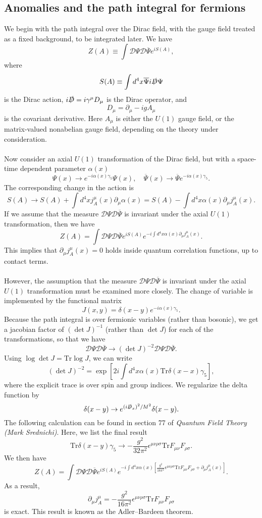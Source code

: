 \subsection{Anomalies and the path integral for fermions}
We begin with the path integral over the Dirac field, with the gauge field treated as a fixed background, to be integrated later. We have
\[Z(A) \equiv \int \mathcal{D}\Psi \mathcal{D}\overline{\Psi} e^{iS(A)},\]
where
\[S(A) \equiv \int d^4x \overline{\Psi}i\slashed{D}\Psi\]
is the Dirac action, $i\slashed{D} = i\gamma^{\mu} D_{\mu}$
is the Dirac operator, and
\[D_{\mu} = \partial_{\mu} - igA_{\mu}\]
is the covariant derivative. 
Here $A_{\mu}$ is either the $U(1)$ gauge field, or the matrix-valued nonabelian gauge field, depending on the theory under consideration.
\\ \\
Now consider an axial $U(1)$ transformation of the Dirac field, but with a space-time dependent parameter $\alpha(x)$
\[\Psi(x) \to e^{-i\alpha(x)\gamma_5}\Psi(x) , \quad \overline{\Psi}(x) \to \overline{\Psi} e^{-i\alpha(x)\gamma_5}.\]
The corresponding change in the action is
\[S(A) \to S(A) + \int d^4x j^{\mu}_A(x) \partial_{\mu}\alpha(x) = S(A) - \int d^4x \alpha(x) \partial_{\mu}j^{\mu}_A(x) .\]
If we assume that the measure $\mathcal{D}\Psi \mathcal{D}\overline{\Psi}$ is invariant under the axial $U(1)$ transformation, then we have
\[Z(A) = \int \mathcal{D}\Psi \mathcal{D}\overline{\Psi} e^{iS(A)} e^{-i \int d^4x \alpha(x)\partial_{\mu}j^{\mu}_A(x) }.\]
This implies that $\partial_{\mu}j^{\mu}_A(x) = 0$ holds inside quantum correlation functions, up to contact terms.
\\ \\
However, the assumption that the measure $\mathcal{D}\Psi \mathcal{D}\overline{\Psi}$ is invariant under the axial $U(1)$ transformation must be examined more closely. The change of variable is implemented by the functional matrix
\[J(x,y) = \delta(x-y)e^{-i\alpha(x)\gamma_5} .\]
Because the path integral is over fermionic variables (rather than bosonic), we get a jacobian factor of $(\det J)^{-1}$ (rather than $\det J$) for each of the transformations, so that we have
\[\mathcal{D}\Psi \mathcal{D}\overline{\Psi} \to (\det J)^{-2}\mathcal{D}\Psi \mathcal{D}\overline{\Psi}.\]
Using $\log \det J = \mathrm{Tr} \log J$, we can write
\[(\det J)^{-2} = \exp \left[2i \int d^4x \alpha(x) \mathrm{Tr}\delta(x-x)\gamma_5 \right],\]
where the explicit trace is over spin and group indices. We regularize the delta function by
\[\delta(x-y) \to e^{(i\slashed{D}_x)^2/M^2} \delta(x-y).\]
The following calculation can be found in section 77 of \emph{Quantum Field Theory (Mark Srednichi)}. Here, we list the final result
\[\mathrm{Tr} \delta(x-y)\gamma_5 \to - \frac{g^2}{32\pi^2} \epsilon^{\mu\nu\rho\sigma} \mathrm{Tr} F_{\mu\nu}F_{\rho\sigma}.\]
We then have
\[Z(A) = \int \mathcal{D}\Psi \mathcal{D}\overline{\Psi} e^{iS(A)} e^{-i \int d^4x \alpha(x)[ \frac{g^2}{16\pi^2} \epsilon^{\mu\nu\rho\sigma} \mathrm{Tr} F_{\mu\nu}F_{\rho\sigma} +  \partial_{\mu}j^{\mu}_A(x)] }.\]
As a result,
\[\partial_{\mu} j^{\mu}_A = -\frac{g^2}{16\pi^2} \epsilon^{\mu\nu\rho\sigma} \mathrm{Tr} F_{\mu\nu}F_{\rho\sigma}\]
is exact. This result is known as the Adler–Bardeen theorem.

